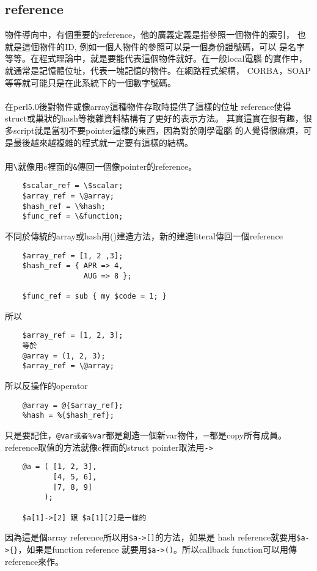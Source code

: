     \subsection{reference}
    物件導向中，有個重要的reference，他的廣義定義是指參照一個物件的索引，
    也就是這個物件的ID, 例如一個人物件的參照可以是一個身份證號碼，可以
    是名字等等。在程式理論中，就是要能代表這個物件就好。在一般local電腦
    的實作中，就通常是記憶體位址，代表一塊記憶的物件。在網路程式架構，
    CORBA，SOAP等等就可能只是在此系統下的一個數字號碼。
    \\\\
    在perl5.0後對物件或像array這種物件存取時提供了這樣的位址
    reference使得struct或巢狀的hash等複雜資料結構有了更好的表示方法。
    其實這實在很有趣，很多script就是當初不要pointer這樣的東西，因為對於剛學電腦
    的人覺得很麻煩，可是最後越來越複雜的程式就一定要有這樣的結構。
    \\\\
    用\verb=\=就像用c裡面的\verb=&=傳回一個像pointer的reference。
    \begin{verbatim}
    $scalar_ref = \$scalar;
    $array_ref = \@array;
    $hash_ref = \%hash;
    $func_ref = \&function;
    \end{verbatim}
    不同於傳統的array或hash用()建造方法，新的建造literal傳回一個reference
    \begin{verbatim}
    $array_ref = [1, 2 ,3];
    $hash_ref = { APR => 4,
                  AUG => 8 };

    $func_ref = sub { my $code = 1; }
    \end{verbatim}
    所以
    \begin{verbatim}
    $array_ref = [1, 2, 3];
    等於
    @array = (1, 2, 3);
    $array_ref = \@array;
    \end{verbatim}
    所以反操作的operator
    \begin{verbatim}
    @array = @{$array_ref};
    %hash = %{$hash_ref};
    \end{verbatim}
    只是要記住，\verb=@var或者%var=都是創造一個新var物件，=都是copy所有成員。
    reference取值的方法就像c裡面的struct pointer取法用\verb=->=
    \begin{verbatim}
    @a = ( [1, 2, 3],
           [4, 5, 6],
           [7, 8, 9]
         );

    $a[1]->[2] 跟 $a[1][2]是一樣的
    \end{verbatim}
    因為這是個array reference所以用\verb=$a->[]=的方法，如果是
    hash reference就要用\verb=$a->{}=，如果是function reference
    就要用\verb=$a->()=。所以callback function可以用傳reference來作。
